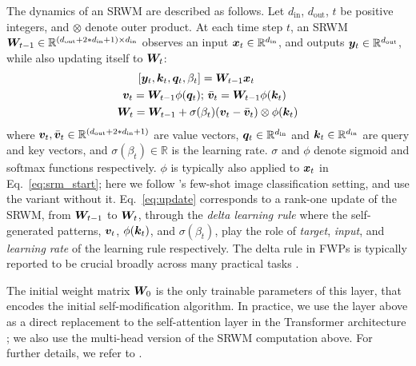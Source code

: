 \documentclass{article}
\begin{document}
The dynamics of an SRWM \citep{IrieSCS22} are described as follows. Let $d_\text{in}$, $d_\text{out}$, $t$ be positive integers, and $\otimes$ denote outer product.
At each time step $t$, an SRWM ${\bm{W}}_{t-1} \in \mathbb{R}^{(d_\text{out} + 2 * d_\text{in} + 1) \times d_\text{in}}$ observes an input ${\bm{x}}_t \in \mathbb{R}^{d_\text{in}}$, and outputs ${\bm{y}}_t \in \mathbb{R}^{d_\text{out}}$, while also updating itself to ${\bm{W}}_{t}$:
\begin{align}
\label{eq:srm_start}
[{\bm{y}}_t, {\bm{k}}_t, {\bm{q}}_t, \beta_t] &= {\bm{W}}_{t-1} {\bm{x}}_t \\
\label{eq:srm_key}
{\bm{v}}_t = {\bm{W}}_{t-1} \phi({\bm{q}}_t)
&; \, \bar{{\bm{v}}}_t = {\bm{W}}_{t-1} \phi({\bm{k}}_t) \\
{\bm{W}}_{t} = {\bm{W}}_{t-1} + \sigma(&\beta_t)({\bm{v}}_t - \bar{{\bm{v}}}_t) \otimes \phi({\bm{k}}_t)
\label{eq:update}
\end{align}
where ${\bm{v}}_t, \bar{{\bm{v}}}_t \in \mathbb{R}^{(d_\text{out} + 2 * d_\text{in} + 1)}$ are value vectors, ${\bm{q}}_t \in \mathbb{R}^{d_\text{in}}$
 and ${\bm{k}}_t \in \mathbb{R}^{d_\text{in}}$ are query and key vectors,
 and $\sigma(\beta_t) \in \mathbb{R}$ is the learning rate.
 $\sigma$ and $\phi$ denote sigmoid and softmax functions respectively.
  $\phi$ is typically also applied to ${\bm{x}}_t$ in Eq.~\ref{eq:srm_start}; here we follow \citet{IrieSCS22}'s few-shot image classification setting, and use the variant without it.
Eq.~\ref{eq:update} corresponds to a
rank-one update of the SRWM, from ${\bm{W}}_{t-1}$ to ${\bm{W}}_{t}$, through the \textit{delta learning rule} \citep{widrow1960adaptive, schlag2021linear}
where the self-generated patterns, ${\bm{v}}_t$, $\phi({\bm{k}}_t)$, and $\sigma(\beta_t)$, play the role of \textit{target}, \textit{input}, and \textit{learning rate} of the learning rule respectively.
The delta rule in FWPs is typically reported to be crucial broadly across many practical tasks \citep{schlag2021linear, irie2021going,irie2022neural,irie2023image}.
  
The initial weight matrix ${\bm{W}}_0$ is the only trainable parameters of this layer, that encodes the initial self-modification algorithm.
In practice, we use the layer above as a direct replacement to the self-attention layer in the Transformer architecture \citep{trafo};
we also use the multi-head version of the SRWM computation above.
For further details, we refer to \citet{IrieSCS22}.
\end{document}
